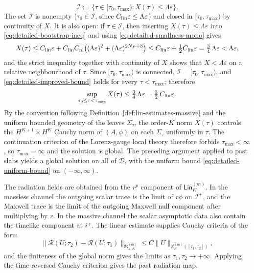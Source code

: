 \documentclass[11pt]{article}
\numberwithin{equation}{section}
\theoremstyle{plain}
\theoremstyle{definition}
\theoremstyle{remark}
\newcommand{\Lin}{\mathsf{Lin}}
\begin{document}
\begin{equation}
 \mathcal I:=\bigl\{\tau\in[\tau_0,\tau_{\max}) : X(\tau)\le \Lambda\varepsilon\bigr\}.
\end{equation}
The set \(\mathcal I\) is nonempty (\(\tau_0\in\mathcal I\), since \(C_{\rm lin}\varepsilon\le\Lambda\varepsilon\)) and closed in \([\tau_0,\tau_{\max})\) by continuity of \(X\). It is also open: if \(\tau\in\mathcal I\), then inserting \(X(\tau)\le\Lambda\varepsilon\) into \eqref{eq:detailed-bootstrap-ineq} and using \eqref{eq:detailed-smallness-mono} gives
\begin{equation}\label{eq:detailed-improved-bound}
 X(\tau)\le C_{\rm lin}\varepsilon
 +C_{\rm lin}C_{\rm nl}\bigl((\Lambda\varepsilon)^2+(\Lambda\varepsilon)^{2N_P+3}\bigr)
 \le C_{\rm lin}\varepsilon+\tfrac12 C_{\rm lin}\varepsilon
 =\tfrac34\,\Lambda\varepsilon
 <\Lambda\varepsilon ,
\end{equation}
and the strict inequality together with continuity of \(X\) shows that \(X<\Lambda\varepsilon\) on a relative neighbourhood of \(\tau\). Since \([\tau_0,\tau_{\max})\) is connected, \(\mathcal I=[\tau_0,\tau_{\max})\), and \eqref{eq:detailed-improved-bound} holds for every \(\tau<\tau_{\max}\); therefore
\begin{equation}\label{eq:detailed-uniform-bound}
 \sup_{\tau_0\le\tau<\tau_{\max}}X(\tau)\le\tfrac34\,\Lambda\varepsilon=\tfrac32\,C_{\rm lin}\varepsilon.
\end{equation}
By the convention following Definition~\ref{def:lin-estimates-massive} and the uniform bounded geometry of the leaves \(\Sigma_\tau\), the order-\(K\) norm \(X(\tau)\) controls the \(H^{K+1}\times H^K\) Cauchy norm of \((A,\phi)\) on each \(\Sigma_\tau\) uniformly in \(\tau\). The continuation criterion of the Lorenz-gauge local theory therefore forbids \(\tau_{\max}<\infty\), so \(\tau_{\max}=\infty\) and the solution is global. The preceding argument applied to past slabs yields a global solution on all of \(\mathcal D\), with the uniform bound \eqref{eq:detailed-uniform-bound} on \((-\infty,\infty)\).

The radiation fields are obtained from the \(r^p\) component of \(\Lin_K^{(m)}\).  In the massless channel the outgoing scalar trace is the limit of \(r\phi\) on \(\mathcal I^+\), and the Maxwell trace is the limit of the outgoing Maxwell null component after multiplying by \(r\).  In the massive channel the scalar asymptotic data also contain the timelike component at \(i^+\).  The linear estimate supplies Cauchy criteria of the form
\begin{equation}\label{eq:detailed-cauchy-radiation}
 \|\mathcal R(U;\tau_2)-\mathcal R(U;\tau_1)\|_{\mathfrak R_{+,K}^{(m)}}
 \le C\|U\|_{\mathbb X_K^{(m)}([\tau_1,\tau_2])},
\end{equation}
and the finiteness of the global norm gives the limits as \(\tau_1,\tau_2\to+\infty\).  Applying the time-reversed Cauchy criterion gives the past radiation map.
\end{document}

